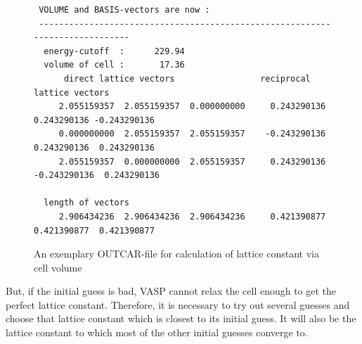 \documentclass[twoside, 11pt, titlepage, captions=nooneline, a4paper, headsepline]{scrbook}%
\newcommand{\9}{\mathrm}
\newcommand{\0}{\,\mathrm}
\begin{document}
\begin{figure}[h!!]
\begin{verbatim}
 VOLUME and BASIS-vectors are now :
 -----------------------------------------------------------------------------
  energy-cutoff  :      229.94
  volume of cell :       17.36
      direct lattice vectors                 reciprocal lattice vectors
     2.055159357  2.055159357  0.000000000     0.243290136  0.243290136 -0.243290136
     0.000000000  2.055159357  2.055159357    -0.243290136  0.243290136  0.243290136
     2.055159357  0.000000000  2.055159357     0.243290136 -0.243290136  0.243290136

  length of vectors
     2.906434236  2.906434236  2.906434236     0.421390877  0.421390877  0.421390877

\end{verbatim}
\caption{An exemplary OUTCAR-file for calculation of lattice constant via cell volume}
\label{boutcar1}
\end{figure}
But, if the initial guess is bad, VASP cannot relax the cell enough to get the perfect lattice constant. Therefore, it is necessary to try out several guesses and choose that lattice constant which is closest to its initial guess. It will also be the lattice constant to which most of the other initial guesses converge to.\\
\end{document}
